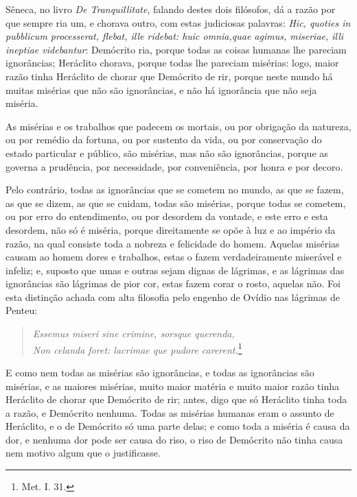 Sêneca, no livro \emph{De Tranquillitate}, falando destes dois filósofos, dá a
razão por que sempre ria um, e chorava outro, com estas judiciosas
palavras: \emph{Hic, quoties in pubblicum processerat, flebat, ille
ridebat: huic omnia,quae agimus, miseriae, illi ineptiae videbantur}:
Demócrito ria, porque todas as coisas humanas lhe pareciam ignorâncias;
Heráclito chorava, porque todas lhe pareciam misérias: logo, maior razão
tinha Heráclito de chorar que Demócrito de rir, porque neste mundo há
muitas misérias que não são ignorâncias, e não há ignorância que não
seja miséria.

As misérias e os trabalhos que padecem os mortais, ou por obrigação da
natureza, ou por remédio da fortuna, ou por sustento da vida, ou por
conservação do estado particular e público, são misérias, mas não são
ignorâncias, porque as governa a prudência, por necessidade, por
conveniência, por honra e por decoro.

Pelo contrário, todas as ignorâncias que se cometem no mundo, as que se
fazem, as que se dizem, as que se cuidam, todas são misérias, porque
todas se cometem, ou por erro do entendimento, ou por desordem da
vontade, e este erro e esta desordem, não só é miséria, porque
direitamente se opõe à luz e ao império da razão, na qual consiste toda
a nobreza e felicidade do homem. Aquelas misérias causam ao homem dores
e trabalhos, estas o fazem verdadeiramente miserável e infeliz; e,
suposto que umas e outras sejam dignas de lágrimas, e as lágrimas das
ignorâncias são lágrimas de pior cor, estas fazem corar o rosto, aquelas
não. Foi esta distinção achada com alta filosofia pelo engenho de Ovídio
nas lágrimas de Penteu:

\begin{verse}
\emph{Essemus miseri sine crimine, sorsque querenda,}\\
\emph{Non celanda foret: lacrimae que pudore carerent.}\footnote{Met. I. 31.}
\end{verse}

E como nem todas as misérias são ignorâncias, e todas as ignorâncias são
misérias, e as maiores misérias, muito maior matéria e muito maior razão
tinha Heráclito de chorar que Demócrito de rir; antes, digo que só
Heráclito tinha toda a razão, e Demócrito nenhuma. Todas as misérias
humanas eram o assunto de Heráclito, e o de Demócrito só uma parte
delas; e como toda a miséria é causa da dor, e nenhuma dor pode ser
causa do riso, o riso de Demócrito não tinha causa nem motivo algum que
o justificasse.

